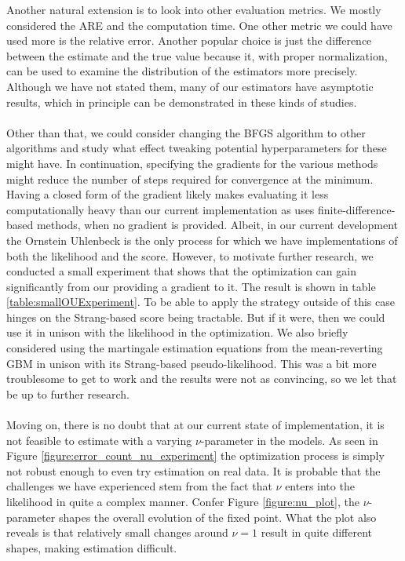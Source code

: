 Another natural extension is to look into other evaluation metrics. We mostly considered the ARE and the computation time. One other metric we could have used more is the relative error. Another popular choice is just the difference between the estimate and the true value because it, with proper normalization, can be used to examine the distribution of the estimators more precisely. Although we have not stated them, many of our estimators have asymptotic results, which in principle can be demonstrated in these kinds of studies.\\\\
Other than that, we could consider changing the BFGS algorithm to other algorithms and study what effect tweaking potential hyperparameters for these might have. In continuation, specifying the gradients for the various methods might reduce the number of steps required for convergence at the minimum. Having a closed form of the gradient likely makes evaluating it less computationally heavy than our current implementation as  uses finite-difference-based methods, when no gradient is provided. Albeit, in our current development the Ornstein Uhlenbeck is the only process for which we have implementations of both the likelihood and the score. However, to motivate further research, we conducted a small experiment that shows that the optimization can gain significantly from our providing a gradient to it. The result is shown in table \ref{table:smallOUExperiment}. To be able to apply the strategy outside of this case hinges on the Strang-based score being tractable. But if it were, then we could use it in unison with the likelihood in the optimization. We also briefly considered using the martingale estimation equations from the mean-reverting GBM in unison with its Strang-based pseudo-likelihood. This was a bit more troublesome to get to work and the results were not as convincing, so we let that be up to further research.  \\\\
Moving on, there is no doubt that at our current state of implementation, it is not feasible to estimate with a varying $\nu$-parameter in the models. As seen in Figure \ref{figure:error_count_nu_experiment} the optimization process is simply not robust enough to even try estimation on real data. It is probable that the challenges we have experienced stem from the fact that $\nu$ enters into the likelihood in quite a complex manner. Confer Figure \ref{figure:nu_plot}, the $\nu$-parameter shapes the overall evolution of the fixed point. What the plot also reveals is that relatively small changes around $\nu = 1$ result in quite different shapes, making estimation difficult.
 
